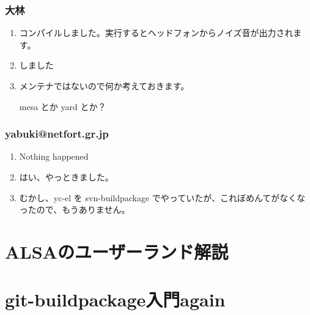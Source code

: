 \documentclass[cjk,dvipdfmx,10pt,compress,%
hyperref={bookmarks=true,bookmarksnumbered=true,bookmarksopen=false,%
colorlinks=false,%
pdftitle={第 77 回 関西 Debian 勉強会},%
pdfauthor={倉敷・のがた・佐々木・かわだ・八津尾},%
pdfsubject={資料},%
}]{beamer}
\begin{document}
\begin{frame}
  \frametitle{ 大林 }
  \begin{enumerate}
  \item コンパイルしました。実行するとヘッドフォンからノイズ音が出力されます。
  \item しました
  \item メンテナではないので何か考えておきます。

    mesa とか yard とか？
  \end{enumerate}
\end{frame}

\begin{frame}
  \frametitle{ yabuki@netfort.gr.jp }
  \begin{enumerate}
  \item Nothing happened
  \item はい、やっときました。
  \item むかし、yc-el を svn-buildpackage でやっていたが、これぼめんてがなくなったので、もうありません。
  \end{enumerate}
\end{frame}


\section{ALSAのユーザーランド解説}


\section{git-buildpackage入門again}

\end{document}
